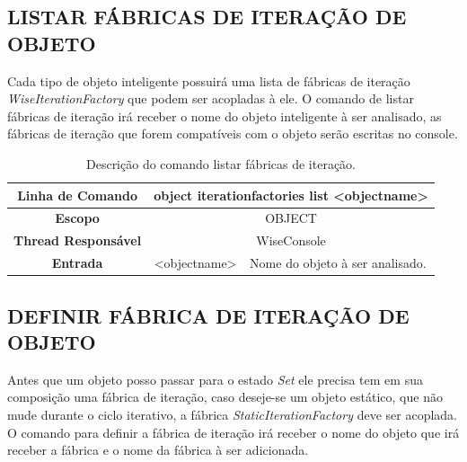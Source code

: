 \documentclass[a4paper,12pt]{monografia}
\theoremstyle{plain}
\theoremstyle{definition}
\theoremstyle{remark}
\begin{document}
\subsection{LISTAR FÁBRICAS DE ITERAÇÃO DE OBJETO}\label{sec:iteration_factories_list}

Cada tipo de objeto inteligente possuirá uma lista de fábricas de iteração \textit{WiseIterationFactory} que podem ser acopladas à ele. O comando de listar fábricas de iteração irá receber o nome do objeto inteligente à ser analisado, as fábricas de iteração que forem compatíveis com o objeto serão escritas no console.

\begin{center}
	\begin{table}[!htbp]
		\begin{tabular}{|c|c|m{}|}
			\hline
			\textbf{Linha de Comando} & \multicolumn{2}{c|}{object iteration\underline{\space\space}factories list <object\underline{\space\space}name>} \\
			\hline
			\textbf{Escopo} & \multicolumn{2}{c|}{OBJECT} \\
			\hline
			\textbf{Thread Responsável} & \multicolumn{2}{c|}{WiseConsole} \\
			\hline
			\textbf{Entrada} & <object\underline{\space\space}name> & Nome do objeto à ser analisado. \\
			\hline
		\end{tabular}
		\caption{Descrição do comando listar fábricas de iteração.}
		\label{tab:iteration_factories_list}
	\end{table}
\end{center}

\subsection{DEFINIR FÁBRICA DE ITERAÇÃO DE OBJETO}\label{sec:iteration_factories_set}

Antes que um objeto posso passar para o estado \textit{Set} ele precisa tem em sua composição uma fábrica de iteração, caso deseje-se um objeto estático, que não mude durante o ciclo iterativo, a fábrica \textit{StaticIterationFactory} deve ser acoplada. O comando para definir a fábrica de iteração irá receber o nome do objeto que irá receber a fábrica e o nome da fábrica à ser adicionada.
\end{document}
